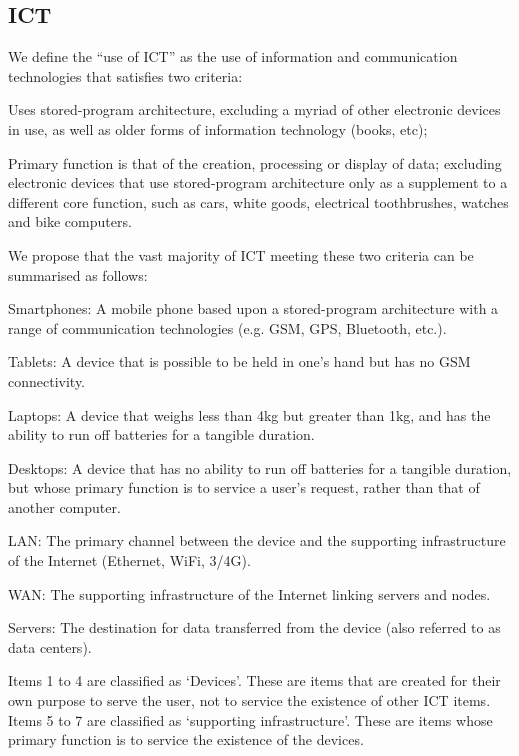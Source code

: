 \documentclass[conference]{IEEEtran}
\begin{document}
\subsection{ICT}

We define the ``use of ICT'' as the use of information and
communication technologies that satisfies two criteria:

\begin{compactitem}
\item Uses stored-program architecture, excluding a myriad of other
  electronic devices in use, as well as older forms of information
  technology (books, etc);
\item Primary function is that of the creation, processing or display
  of data; excluding electronic devices that use stored-program
  architecture only as a supplement to a different core function, such
  as cars, white goods, electrical toothbrushes, watches and bike
  computers.
\end{compactitem}

We propose that the vast majority of ICT meeting these two criteria can be
summarised as follows:

\begin{compactenum}
\item Smartphones: A mobile phone based upon a stored-program
  architecture with a range of communication technologies (e.g. GSM, GPS,
  Bluetooth, etc.).
\item Tablets: A device that is possible to be held in one's hand but
  has no GSM connectivity.
\item Laptops: A device that weighs less than 4kg but greater
  than 1kg, and has the ability to run off batteries for a
  tangible duration.
\item Desktops: A device that has no ability to run off batteries for
  a tangible duration, but whose primary function is to service a
  user's request, rather than that of another computer.
\item LAN: The primary channel between the device and the supporting
  infrastructure of the Internet (Ethernet, WiFi, 3/4G).
\item WAN: The supporting infrastructure of the Internet linking
  servers and nodes.
\item Servers: The destination for data transferred from the device
  (also referred to as data centers).
\end{compactenum}

Items 1 to 4 are classified as `Devices'. These are items that are
created for their own purpose to serve the user, not to service the
existence of other ICT items. Items 5 to 7 are classified as
`supporting infrastructure'. These are items whose primary function is
to service the existence of the devices.
\end{document}
